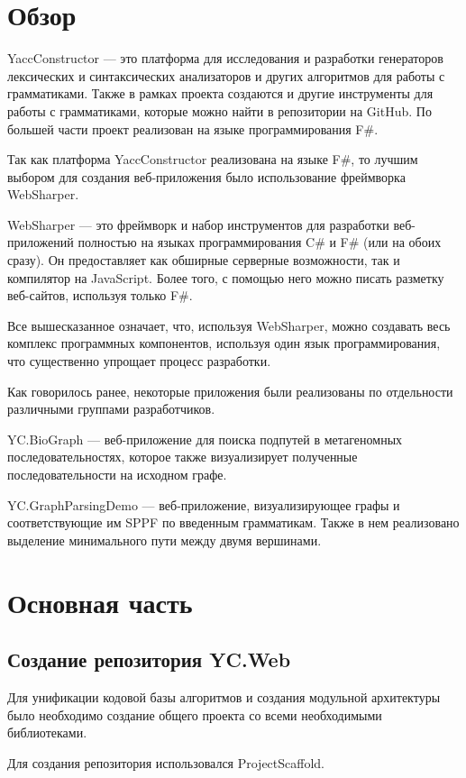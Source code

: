 \documentclass[14pt]{matmex-diploma-custom}
\begin{document}
\section {Обзор}
YaccConstructor --- это платформа для исследования и разработки генераторов лексических и синтаксических анализаторов и других алгоритмов для работы с грамматиками. Также в рамках проекта создаются и другие инструменты для работы с грамматиками, которые можно найти в репозитории на GitHub. По большей части проект реализован на языке программирования F\#.

Так как платформа YaccConstructor реализована на языке F\#, то  лучшим выбором для создания веб-приложения было использование фреймворка WebSharper.

WebSharper --- это фреймворк и набор инструментов для разработки веб-приложений полностью на языках программирования C\# и F\# (или на обоих сразу). Он предоставляет как обширные серверные возможности, так и компилятор на JavaScript. Более того, с помощью него можно писать разметку веб-сайтов, используя только F\#. 

Все вышесказанное означает, что, используя WebSharper, можно создавать весь комплекс программных компонентов, используя один язык программирования, что существенно упрощает процесс разработки.

Как говорилось ранее, некоторые приложения были реализованы по отдельности различными группами разработчиков. 

 YC.BioGraph --- веб-приложение для поиска подпутей в метагеномных последовательностях, которое также визуализирует полученные последовательности на исходном графе.

YC.GraphParsingDemo --- веб-приложение, визуализирующее графы и соответствующие им SPPF по введенным грамматикам. Также в нем реализовано выделение минимального пути между двумя вершинами.

\section {Основная часть}
\subsection{Создание репозитория YC.Web}

Для унификации кодовой базы алгоритмов и создания модульной архитектуры  было необходимо создание общего проекта со всеми необходимыми библиотеками. 
	
Для создания репозитория использовался ProjectScaffold. 
\end{document}
